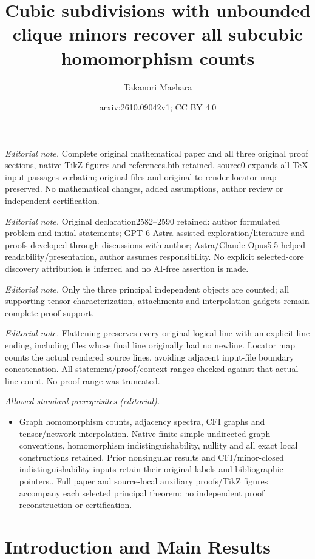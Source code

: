 \documentclass[10pt,a4paper]{article}
\title{Cubic subdivisions with unbounded clique minors recover all subcubic homomorphism counts}
\author{Takanori Maehara}
\date{arxiv:2610.09042v1; CC BY 4.0}
\theoremstyle{plain}
\theoremstyle{definition}
\begin{document}
\maketitle
\noindent\textit{Editorial note.} Complete original mathematical paper and all three original proof sections, native TikZ figures and references.bib retained. source0 expands all TeX input passages verbatim; original files and original-to-render locator map preserved. No mathematical changes, added assumptions, author review or independent certification.\par\medskip
\noindent\textit{Editorial note.} Original declaration2582--2590 retained: author formulated problem and initial statements; GPT-6 Astra assisted exploration/literature and proofs developed through discussions with author; Astra/Claude Opus5.5 helped readability/presentation, author assumes responsibility. No explicit selected-core discovery attribution is inferred and no AI-free assertion is made.\par\medskip
\noindent\textit{Editorial note.} Only the three principal independent objects are counted; all supporting tensor characterization, attachments and interpolation gadgets remain complete proof support.\par\medskip
\noindent\textit{Editorial note.} Flattening preserves every original logical line with an explicit line ending, including files whose final line originally had no newline. Locator map counts the actual rendered source lines, avoiding adjacent input-file boundary concatenation. All statement/proof/context ranges checked against that actual line count. No proof range was truncated.\par\medskip
\noindent\textit{Allowed standard prerequisites (editorial).}\begin{itemize}
\item Graph homomorphism counts, adjacency spectra, CFI graphs and tensor/network interpolation. Native finite simple undirected graph conventions, homomorphism indistinguishability, nullity and all exact local constructions retained. Prior nonsingular results and CFI/minor-closed indistinguishability inputs retain their original labels and bibliographic pointers.. Full paper and source-local auxiliary proofs/TikZ figures accompany each selected principal theorem; no independent proof reconstruction or certification.
\end{itemize}\medskip
\section{Introduction and Main Results}
\label{sec:intro}
\end{document}

